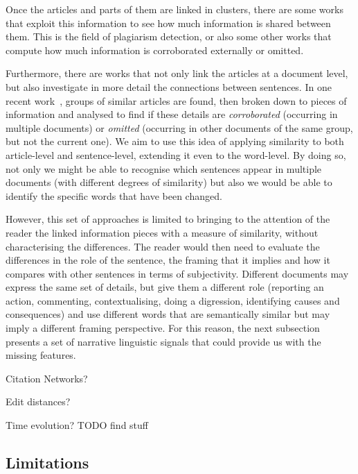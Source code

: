 

Once the articles and parts of them are linked in clusters, there are some works that exploit this information to see how much information is shared between them. This is the field of plagiarism detection, or also some other works that compute how much information is corroborated externally or omitted.

Furthermore, there are works that not only link the articles at a document level, but also investigate in more detail the connections between sentences.
In one recent work~\cite{bountouridis2018explaining}, groups of similar articles are found, then broken down to pieces of information and analysed to find if these details are \emph{corroborated} (occurring in multiple documents) or \emph{omitted} (occurring in other documents of the same group, but not the current one). 
We aim to use this idea of applying similarity to both article-level and sentence-level, extending it even to the word-level. By doing so,
not only we might be able to recognise which sentences appear in multiple documents (with different degrees of similarity) but also we would be able to identify the specific words that have been changed.


However, this set of approaches is limited to bringing to the attention of the reader the linked information pieces with a measure of similarity, without characterising the differences. The reader would then need to evaluate the differences in the role of the sentence, the framing that it implies and how it compares with other sentences in terms of subjectivity.
Different documents may express the same set of details, but give them a different role (reporting an action, commenting, contextualising, doing a digression, identifying causes and consequences) and use different words that are semantically similar but may imply a different framing perspective.
For this reason, the next subsection presents a set of narrative linguistic signals that could provide us with the missing features.

Citation Networks?

Edit distances?

Time evolution? TODO find stuff

\subsection{Limitations}
\label{ssec:lit_relationships_limitations}

